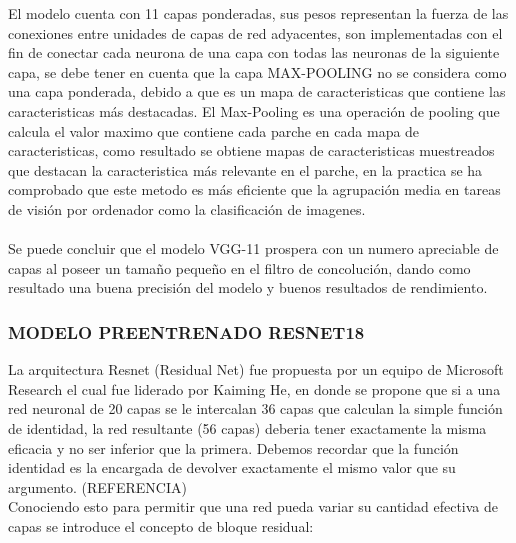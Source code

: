 			El modelo cuenta con 11 capas ponderadas, sus pesos representan la fuerza de las conexiones entre unidades de capas de red adyacentes, son implementadas con el fin de conectar cada neurona de una capa con todas las neuronas de la siguiente capa, se debe tener en cuenta que la capa MAX-POOLING no se considera como una capa ponderada, debido a que es un mapa de caracteristicas que contiene las caracteristicas más destacadas. El Max-Pooling es una operación de pooling que calcula el valor maximo que contiene cada parche en cada mapa de caracteristicas, como resultado se obtiene mapas de caracteristicas muestreados que destacan la caracteristica más relevante en el parche, en la practica se ha comprobado que este metodo es más eficiente que la agrupación media en tareas de visión por ordenador como la clasificación de imagenes.
			\\
			\\
			Se puede concluir que el modelo VGG-11 prospera con un numero apreciable de capas al poseer un tamaño pequeño en el filtro de concolución, dando como resultado una buena precisión del modelo y buenos resultados de rendimiento.
			 
			
			
			
			
\newpage
			\subsubsection{\MakeUppercase{Modelo preentrenado RESNET18}}
				La arquitectura Resnet (Residual Net) fue propuesta por un equipo de Microsoft Research el cual fue liderado por Kaiming He, en donde se propone que si a una red neuronal de 20 capas se le intercalan 36 capas que calculan la simple función de identidad, la red resultante (56 capas) deberia tener exactamente la misma eficacia y no ser inferior que la primera. Debemos recordar que la función identidad es la encargada de devolver exactamente el mismo valor que su argumento. (REFERENCIA)
				\\
				Conociendo esto para permitir que una red pueda variar su cantidad efectiva de capas se introduce el concepto de bloque residual:
	
